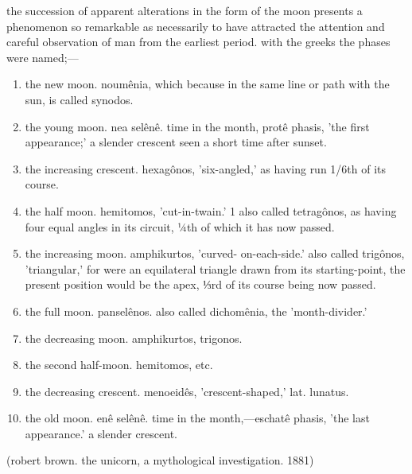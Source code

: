\documentclass[12pt,a4paper,british,landscape]{article}
\begin{document}
the succession of apparent alterations in the form of the moon presents a phenomenon so remarkable as necessarily to have attracted the attention and careful observation of man from the earliest period. with the greeks the phases were named;—

\begin{enumerate}[I]
\setlength\itemsep{0.02cm}

    

\item \small the new moon. noumênia, which because in the same line or path with the sun, is called synodos.

\item the young moon. nea selênê. time in the month, protê phasis, 'the first appearance;' a slender crescent seen a short time after sunset.

\item the increasing crescent. hexagônos, 'six-angled,' as having run 1/6th of its course.

\item the half moon. hemitomos, 'cut-in-twain.' 1 also called tetragônos, as having four equal angles in its circuit, ¼th of which it has now passed.

\item the increasing moon. amphikurtos, 'curved- on-each-side.' also called trigônos, 'triangular,' for were an equilateral triangle drawn from its starting-point, the present position would be the apex, ⅓rd of its course being now passed.

\item the full moon. panselênos. also called dichomênia, the 'month-divider.'

\item  the decreasing moon. amphikurtos, trigonos.

\item the second half-moon. hemitomos, etc.

\item the decreasing crescent. menoeidês, 'crescent-shaped,' lat. lunatus.

\item  the old moon. enê selênê. time in the month,—eschatê phasis, 'the last appearance.' a slender crescent.

\end{enumerate}

\vspace{-0.6cm}

\begin{center}
(robert brown. the unicorn, a mythological investigation. 1881)
\end{center}
\end{document}
